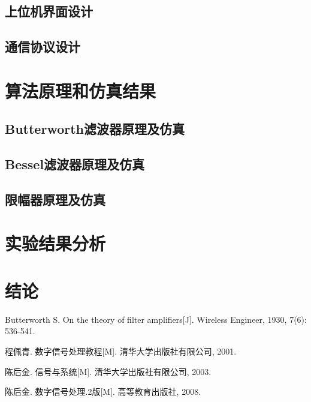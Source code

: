 \documentclass[10pt,a4paper]{article}
\begin{document}
\subsection{上位机界面设计}


\subsection{通信协议设计}


\section{算法原理和仿真结果}

\subsection{Butterworth滤波器原理及仿真}


\subsection{Bessel滤波器原理及仿真}


\subsection{限幅器原理及仿真}





\section{实验结果分析}
\section{结论}



\begin{thebibliography}{4}
Butterworth S. On the theory of filter amplifiers[J]. Wireless Engineer, 1930, 7(6): 536-541.

程佩青. 数字信号处理教程[M]. 清华大学出版社有限公司, 2001.

陈后金. 信号与系统[M]. 清华大学出版社有限公司, 2003.

陈后金. 数字信号处理.2版[M]. 高等教育出版社, 2008.
\end{thebibliography}
\end{document}
